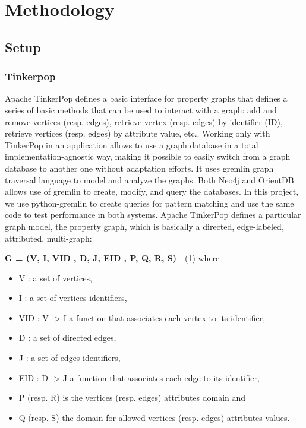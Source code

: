 \section{Methodology}

\subsection{Setup}

\subsubsection{Tinkerpop}

Apache TinkerPop defines a basic interface for property graphs that defines a series of basic methods that can be used to interact with a graph: add and remove vertices (resp. edges), retrieve vertex (resp. edges) by identifier (ID), retrieve vertices (resp. edges) by attribute value, etc.. Working only with TinkerPop in an application allows to use a graph database in a total implementation-agnostic way, making it possible to easily switch from a graph database to another one without adaptation efforts. It uses gremlin graph traversal language to model and analyze the graphs. Both Neo4j and OrientDB allows use of gremlin to create, modify, and query the databases. In this project, we use python-gremlin to create queries for pattern matching and use the same code to test performance in both systems. Apache TinkerPop defines a particular graph model, the property graph, which is basically a directed, edge-labeled, attributed, multi-graph:

\textbf{G = (V, I, VID , D, J, EID , P, Q, R, S)} - (1)
where 
\begin{itemize}
\item V : a set of vertices, 
\item I : a set of vertices identifiers, 
\item VID : V -> I a function that associates each vertex to its identifier, 
\item D : a set of directed edges, 
\item J : a set of edges identifiers, 
\item EID : D -> J a function that associates each edge to its identifier, 
\item P (resp. R) is the vertices (resp. edges) attributes domain and 
\item Q (resp. S) the domain for allowed vertices (resp. edges) attributes values.
\end{itemize}



